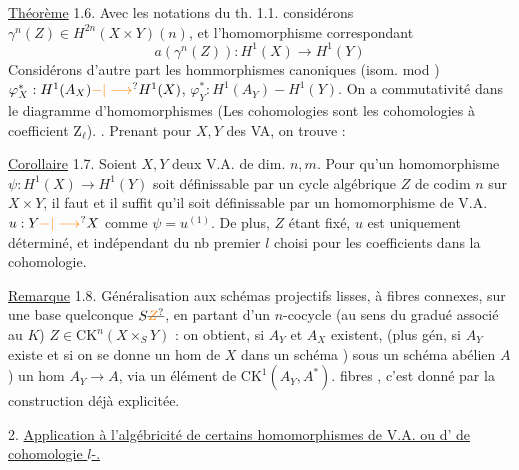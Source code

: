 \uline{Théorème} 1.6. Avec les notations du th. 1.1. considérons $\gamma^n(Z)\in H^{2n}(X\times Y)(n)$, et l'homomorphisme correspondant
\[
a(\gamma^n(Z)):H^1(X)\longrightarrow H^1(Y)
\]
 Considérons d'autre part  les hommorphismes canoniques (isom. mod ) $\varphi_X^*:H^1(A_X)\unsure{-|\longrightarrow} H^1(X)$, $\varphi_Y^*:H^1(A_Y)-H^1(Y)$. On a commutativité dans le diagramme d'homomorphismes
(Les cohomologies sont les cohomologies à coefficient $\mathrm{Z}_{\ell}$). .
 Prenant pour $X,Y$ des VA, on trouve :

\uline{Corollaire} 1.7.  Soient $X,Y$ deux V.A. de dim. $n,m$. Pour qu'un homomorphisme $\psi:H^1(X)\longrightarrow H^1(Y)$ soit définissable par un cycle algébrique $Z$ de  codim $n$ sur $X\times Y$, il faut et il suffit qu'il soit définissable par un homomorphisme de V.A. $u:Y\unsure{-|\longrightarrow}X$ comme $\psi=u^{(1)}$. De plus, $Z$ étant fixé,  $u$ est uniquement déterminé, et indépendant du nb premier $l$ choisi pour les coefficients dans la cohomologie.

\uline{Remarque} 1.8. Généralisation  aux schémas projectifs lisses, à fibres  connexes, sur une base quelconque $S\deleted{\unsure{Z}}$, en partant d'un $n$-cocycle (au sens du  gradué associé au $K$) $Z\in{\mathrm{CK}}^n(X\times_S Y)$ : on obtient, si $A_Y$ et $A_X$ existent, (plus gén, si $A_Y$ existe
et si on se donne un hom de $X$ dans un  schéma ) sous un schéma abélien $A$) un hom $A_Y\longrightarrow A$, via un élément de ${\mathrm{CK}}^1(A_Y,A^*)$.  fibres , c'est donné par la construction déjà explicitée\deleted{\unsure{)}}.

2. \uline{Application à l'algébricité de certains homomorphismes de V.A. ou d' de cohomologie $l$-.}

